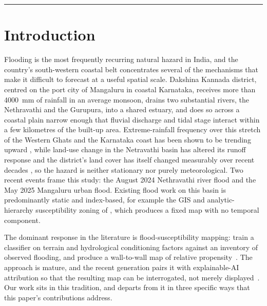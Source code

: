 \documentclass[11pt,a4paper]{article}
\begin{document}
\vspace{4pt}
\hrule
\vspace{10pt}

\section{Introduction}
\label{sec:intro}

Flooding is the most frequently recurring natural hazard in India, and the
country's south-western coastal belt concentrates several of the mechanisms that
make it difficult to forecast at a useful spatial scale. Dakshina Kannada
district, centred on the port city of Mangaluru in coastal Karnataka, receives
more than \SI{4000}{\milli\metre} of rainfall in an average monsoon, drains two
substantial rivers, the Nethravathi and the Gurupura, into a shared estuary, and
does so across a coastal plain narrow enough that fluvial discharge and tidal
stage interact within a few kilometres of the built-up area. Extreme-rainfall
frequency over this stretch of the Western Ghats and the Karnataka coast has been
shown to be trending upward \citep{chandrashekar2018}, while land-use change in
the Netravathi basin has altered its runoff response
\citep{chandana2023,babar2015} and the district's land cover has itself changed
measurably over recent decades \citep{naik2022}, so the hazard is neither
stationary nor purely meteorological. Two recent events frame this study: the
August 2024 Nethravathi river flood and the May 2025 Mangaluru urban flood.
Existing flood work on this basin is predominantly static and index-based, for
example the GIS and analytic-hierarchy susceptibility zoning of
\citet{nirmala2026}, which produces a fixed map with no temporal component.

The dominant response in the literature is flood-susceptibility mapping: train a
classifier on terrain and hydrological conditioning factors against an inventory
of observed flooding, and produce a wall-to-wall map of relative
propensity~\citep{tehrany2014,khosravi2018,arabameri2019,saha2021}. The approach
is mature, and the recent generation pairs it with explainable-AI attribution so
that the resulting map can be interrogated, not merely
displayed~\citep{lundberg2017,aydin2022,seydi2023}. Our work sits in this
tradition, and departs from it in three specific ways that this paper's
contributions address.
\end{document}
